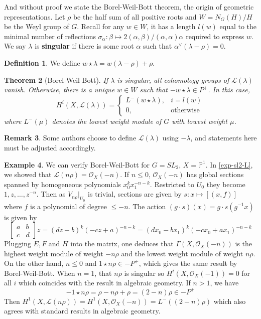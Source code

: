 \documentclass[11pt, a4paper]{article}
\newtheorem{theorem}{Theorem}[subsection]
\theoremstyle{definition}
\newtheorem{remark}[theorem]{Remark}
\newtheorem{example}[theorem]{Example}
\newtheorem{definition}[theorem]{Definition}
\newcommand{\s}[0]{\sigma}
\begin{document}
    And without proof we state the Borel-Weil-Bott theorem, the origin of geometric representations. Let $\rho$ be the half sum of all positive roots and $W=N_G(H)/H$ be the Weyl group of $G$. Recall for any $w\in W$, it has a length $l(w)$ equal to the minimal number of reflections $\s_\alpha:\beta\mapsto 2(\alpha, \beta)/(\alpha,\alpha)\alpha$ required to express $w$. We say $\lambda$ is \textbf{singular} if there is some root $\alpha$ such that $\alpha^\vee(\lambda-\rho)=0$.
    \begin{definition}
        We define $w\star \lambda=w(\lambda-\rho)+\rho$.
    \end{definition}
    \begin{theorem}[Borel-Weil-Bott]\label{thm-borel-weil-bott}
        If $\lambda$ is singular, all cohomology groups of $\mathcal L(\lambda)$ vanish. Otherwise, there is a \textup{unique} $w\in W$ such that $-w\star \lambda\in P^+$. In this case,
        \[H^i(X, \mathcal L(\lambda))=\begin{cases}
            L^-(w\star\lambda), & i=l(w)\\
            0, &\text{otherwise}
        \end{cases}\]
        where $L^-(\mu)$ denotes the lowest weight module of $G$ with lowest weight $\mu$.
    \end{theorem}
    \begin{remark}
        Some authors choose to define $\mathcal L(\lambda)$ using $-\lambda$, and statements here must be adjusted accordingly.
    \end{remark}
    \begin{example}
        We can verify Borel-Weil-Bott for $G=SL_2$, $X=\mathbb P^1$. In \cref{exp-sl2-L}, we showed that $\mathcal L(n\rho)=\mathcal O_X(-n)$. If $n\leqslant 0$, $\mathcal O_X(-n)$ has global sections spanned by homogeneous polynomials $x_0^kx_1^{-n-k}$. Restricted to $U_0$ they become $1,z,\dots, z^{-n}$. Then as $V_{n\rho}|_{U_0}$ is trivial, sections are given by $s:x\mapsto [(x, f)]$ where $f$ is a polynomial of degree $\leqslant -n$. The action $(g\cdot s)(x)=g\cdot s(g^{-1}x)$ is given by
        \[\begin{bmatrix}
            a & b\\
            c & d
        \end{bmatrix}z=(dz-b)^k(-cz+a)^{-n-k}=(dx_0-bx_1)^k(-cx_0+ax_1)^{-n-k}\]
        Plugging $E, F$ and $H$ into the matrix, one deduces that $\Gamma(X, \mathcal O_X(-n))$ is the highest weight module of weight $-n\rho$ and the lowest weight module of weight $n\rho$. On the other hand, $n\leqslant 0$ and $1\star n\rho\in -P^+$, which gives the same result by Borel-Weil-Bott. When $n=1$, that $n\rho$ is singular so $H^i(X, \mathcal O_X(-1))=0$ for all $i$ which coincides with the result in algebraic geometry. If $n>1$, we have
        \[-1\star n\rho=\rho-n\rho+\rho=(2-n)\rho\in -P^+\]
        Then $H^1(X,\mathcal L(n\rho))=H^1(X,\mathcal O_X(-n))=L^-((2-n)\rho)$ which also agrees with standard results in algebraic geometry.
    \end{example}
\end{document}
